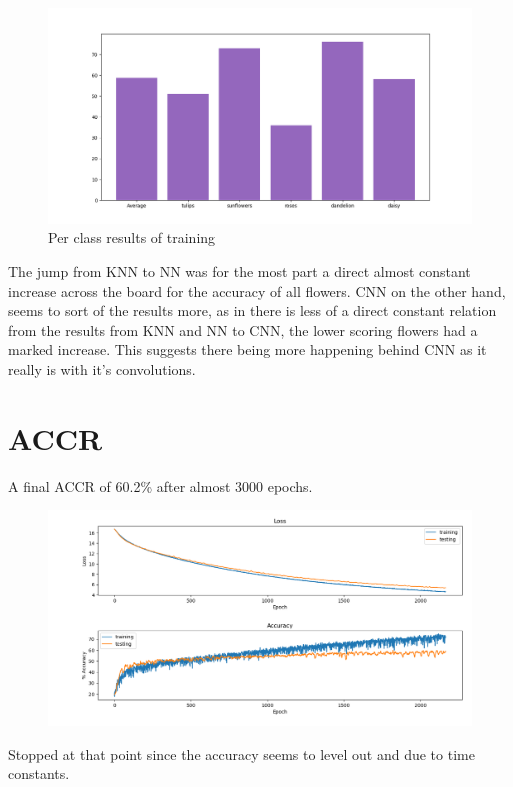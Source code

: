 \documentclass{article}
\begin{document}
\begin{figure}[H]
	\centering
	\includegraphics[width=\textwidth]{figure_6.png}
	\caption{Per class results of training}
\end{figure}

The jump from KNN to NN was for the most part a direct almost constant increase across the board for the accuracy of all flowers.
CNN on the other hand, seems to sort of  the results more, as in there is less of a direct constant relation from the results from KNN and NN to CNN, the lower scoring flowers had a marked increase. This suggests there being more  happening behind CNN as it really is with it's convolutions.

\section{ACCR}

A final ACCR of 60.2\% after almost 3000 epochs.

\begin{figure}[H]
	\centering
	\includegraphics[width=\textwidth]{figure_5.png}
\end{figure}

Stopped at that point since the accuracy seems to level out and due to time constants.
\end{document}
